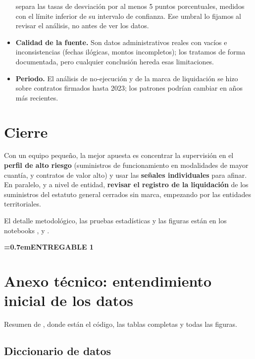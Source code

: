 \documentclass[11pt,a4paper]{article}
\newcommand{\parteactual}{Informe ejecutivo}
\newcommand{\etiqueta}[1]{{\etiquetafont\small\bfseries\spaceskip=0.7em\relax\color{acento}\MakeUppercase{#1}}}
\begin{document}
\begin{itemize}
    separa las tasas de desviación por al menos 5 puntos porcentuales, medidos con el límite inferior de su
    intervalo de confianza. Ese umbral lo fijamos al revisar el análisis, no antes de ver los datos.
  \item \textbf{Calidad de la fuente.} Son datos administrativos reales con vacíos e inconsistencias (fechas
    ilógicas, montos incompletos); los tratamos de forma documentada, pero cualquier conclusión hereda esas
    limitaciones.
  \item \textbf{Periodo.} El análisis de no-ejecución y de la marca de liquidación se hizo sobre contratos firmados hasta
    2023; los patrones podrían cambiar en años más recientes.
\end{itemize}

\section{Cierre}

Con un equipo pequeño, la mejor apuesta es concentrar la supervisión en el \textbf{perfil de alto riesgo}
(suministros de funcionamiento en modalidades de mayor cuantía, y contratos de valor alto) y usar las
\textbf{señales individuales} para afinar. En paralelo, y a nivel de entidad, \textbf{revisar el registro de la liquidación} de los
suministros del estatuto general cerrados sin marca, empezando por las entidades territoriales.

\vspace{6pt}
{\small\color{gris}El detalle metodológico, las pruebas estadísticas y las figuras están en los notebooks
,  y .}

\clearpage
\renewcommand{\parteactual}{Anexo técnico}
\etiqueta{Entregable 1}

\section{Anexo técnico: entendimiento inicial de los datos}

Resumen de , donde están el código, las tablas completas y todas las
figuras.

\subsection{Diccionario de datos}
\end{document}
